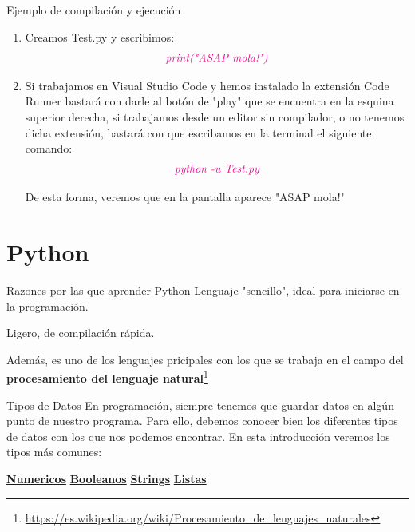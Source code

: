 \documentclass{beamer}
\begin{document}
\begin{frame}{Ejemplo de compilación y ejecución}
\begin{enumerate}
\item Creamos Test.py y escribimos: 
\begin{gather}
\color{magenta}\textit{print("ASAP mola!")}
\end{gather}
\item Si trabajamos en Visual Studio Code y hemos instalado la extensión Code Runner bastará con darle al botón de "play" que se encuentra en la esquina superior derecha, si trabajamos desde un editor sin compilador, o no tenemos dicha extensión, bastará con que escribamos en la terminal el siguiente comando:
\begin{gather}
\color{magenta}\textit{python -u Test.py}
\end{gather}

De esta forma, veremos que en la pantalla aparece "ASAP mola!"
\end{enumerate}
\end{frame}

\section{Python}

\begin{frame}{Razones por las que aprender Python}
\setlength{\parskip}{8mm} %
Lenguaje "sencillo", ideal para iniciarse en la programación.

Ligero, de compilación rápida.

Además, es uno de los lenguajes pricipales con los que se trabaja en el campo del \textbf{procesamiento del lenguaje natural}\footnote{\url{https://es.wikipedia.org/wiki/Procesamiento_de_lenguajes_naturales}}
\end{frame}

\begin{frame}{Tipos de Datos}
En programación, siempre tenemos que guardar datos en algún punto de nuestro programa. Para ello, debemos conocer bien los diferentes tipos de datos con los que nos podemos encontrar. En esta introducción veremos los tipos más comunes:
\vspace{1cm}

\centering\hyperlink{datos:numericos}{\textbf{Numericos}}
\hspace{1cm} \hyperlink{datos:booleanos}{\textbf{Booleanos}}
\hspace{1cm} \hyperlink{datos:strings}{\textbf{Strings}}
\hspace{1cm} \hyperlink{datos:listas}{\textbf{Listas}}
\end{frame}
\end{document}
